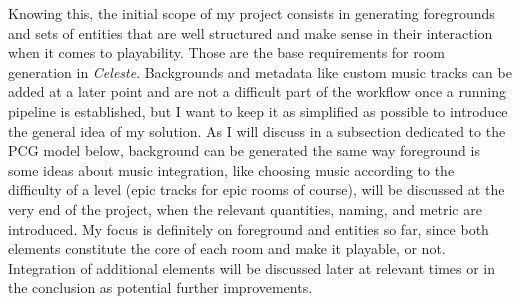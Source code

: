 \documentclass{article}
\newcommand{\Celnosp}{\textit{Celeste}}
\begin{document}
Knowing this, the initial scope of my project consists in generating foregrounds and sets of entities that are well structured and make sense in their interaction when it comes to playability. Those are the base requirements for room generation in \Celnosp. Backgrounds and metadata like custom music tracks can be added at a later point and are not a difficult part of the workflow once a running pipeline is established, but I want to keep it as simplified as possible to introduce the general idea of my solution. As I will discuss in a subsection dedicated to the PCG model below, background can be generated the same way foreground is some ideas about music integration, like choosing music according to the difficulty of a level (epic tracks for epic rooms of course), will be discussed at the very end of the project, when the relevant quantities, naming, and metric are introduced. My focus is definitely on foreground and entities so far, since both elements constitute the core of each room and make it playable, or not. Integration of additional elements will be discussed later at relevant times or in the conclusion as potential further improvements.
\end{document}
